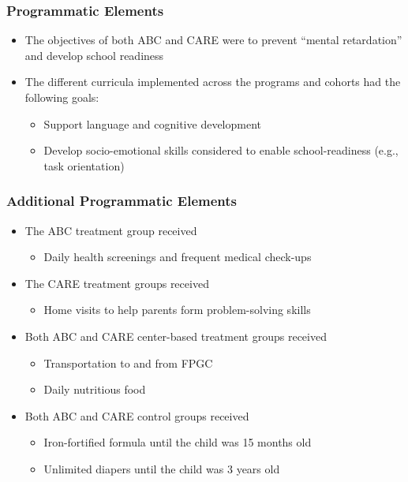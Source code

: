 \documentclass[static]{JJH-Beamer}
\begin{document}
\clearpage
\begin{frame}
\frametitle{Programmatic Elements}

\begin{itemize}
\item The objectives of both ABC and CARE were to prevent ``mental retardation'' and develop school readiness
\item The different curricula implemented across the programs and cohorts had the following goals:
	\begin{itemize}
    \item Support language and cognitive development
	\item Develop socio-emotional skills considered to enable school-readiness (e.g., task orientation)
	\end{itemize}
\end{itemize}

\end{frame}

\begin{frame}
\frametitle{Additional Programmatic Elements}

\begin{itemize}
\item The ABC treatment group received
	\begin{itemize}
	\item Daily health screenings and frequent medical check-ups
	\end{itemize}
\item The CARE treatment groups received
	\begin{itemize}
	\item Home visits to help parents form problem-solving skills
	\end{itemize}
\item Both ABC and CARE center-based treatment groups received
	\begin{itemize}
	\item Transportation to and from FPGC
	\item Daily nutritious food
	\end{itemize}
\item Both ABC and CARE control groups received
	\begin{itemize}
	\item Iron-fortified formula until the child was 15 months old
	\item Unlimited diapers until the child was 3 years old
	\end{itemize}
\end{itemize}

\end{frame}
\end{document}
